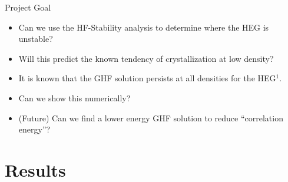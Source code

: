 \documentclass[10pt]{beamer}
\begin{document}
{{{{{{{{%
\begin{frame}{Project Goal}
	\begin{itemize}[<+->]
		\item{Can we use the HF-Stability analysis to determine where the HEG is unstable?}
		\item{Will this predict the known tendency of crystallization at low density?}
		\item{It is known that the GHF solution persists at all densities for the HEG$^1$.}
		\item{Can we show this numerically?}
		\item{(Future) Can we find a lower energy GHF solution to reduce ``correlation energy''?}
	\end{itemize}
\end{frame}



\section{Results}

}}}}}}}}
\end{document}
